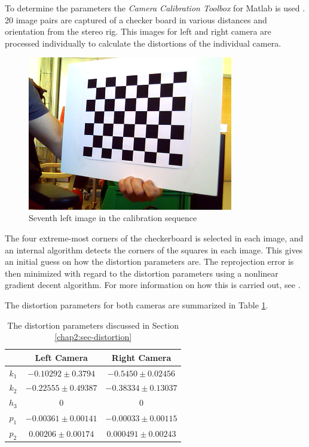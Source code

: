 To determine the parameters the \emph{Camera Calibration Toolbox} for Matlab is used
\cite{camera-calib-toolbox}. 20 image pairs are captured of a checker board in various
distances and orientation from the stereo rig. This images for left and right camera are
processed individually to calculate the distortions of the individual camera. 
\begin{figure}[htbp]
    \centering
    \includegraphics[width=0.8\textwidth]{pics/left7}
    \caption{Seventh left image in the calibration sequence}
    \label{chap2:fig-checkerboard}
\end{figure}
The four extreme-most corners of the checkerboard is selected in each image, and an
internal algorithm detects the corners of the squares in each image. This gives an initial
guess on how the distortion parameters are. The reprojection error is then minimized with
regard to the distortion parameters using a nonlinear gradient decent algorithm. For more
information on how this is carried out, see \cite{heikkila}.

The distortion parameters for both cameras are summarized in Table
\ref{chap3:tab-distortion-coeffs}.
\begin{table}[htbp]
  \centering
    \begin{tabular}{|c|c|c|} 
        \hline
                & Left Camera       & Right Camera \\
        \hline
        $k_1$   & $-0.10292 \pm 0.3794$            & $-0.5450 \pm 0.02456$  \\
        $k_2$   & $-0.22555 \pm 0.49387$            & $-0.38334 \pm 0.13037$  \\
        $h_3$   & $ 0$                          & $0$                  \\
        \hline
        $p_1$   & $-0.00361 \pm 0.00141$    & $-0.00033 \pm 0.00115$ \\
        $p_2$   & $0.00206 \pm 0.00174$     & $ 0.000491 \pm 0.00243$  \\
        \hline
    \end{tabular}
    \caption{The distortion parameters discussed in Section \ref{chap2:sec-distortion}}
    \label{chap3:tab-distortion-coeffs}
\end{table}





